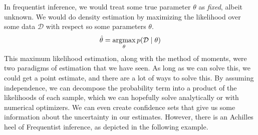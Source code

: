In frequentist inference, we would treat some true parameter $\theta$ as \textit{fixed}, albeit unknown. We would do density estimation by maximizing the likelihood over some data $\mathcal{D}$ with respect so some parameters $\theta$. 
\begin{equation}
  \hat{\theta} = \argmax_{\theta} p(\mathcal{D} \mid \theta)
\end{equation}
This maximum likelihood estimation, along with the method of moments, were two paradigms of estimation that we have seen. As long as we can solve this, we could get a point estimate, and there are a lot of ways to solve this. By assuming independence, we can decompose the probability term into a product of the likelihoods of each sample, which we can hopefully solve analytically or with numerical optimizers. We can even create confidence sets that give us some information about the uncertainty in our estimates. However, there is an Achilles heel of Frequentist inference, as depicted in the following example. 

